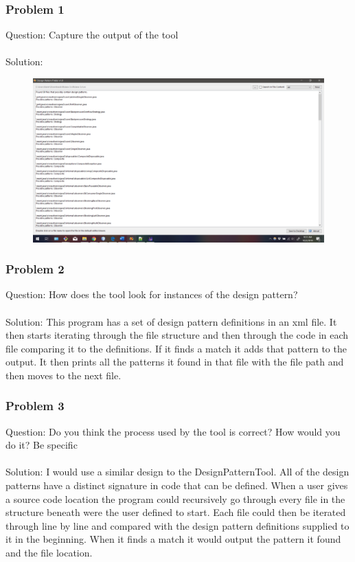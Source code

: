 \documentclass{article}
\begin{document}
\subsubsection*{Problem 1}
Question: Capture the output of the tool\\\\
Solution: 
\begin{figure}[h]
	\centering
	\includegraphics[width=6in]{hw4-patterns.png}
\end{figure}

\subsubsection*{Problem 2}
Question: How does the tool look for instances of the design pattern?\\\\
Solution: This program has a set of design pattern definitions in an xml file. It then starts iterating through the file structure and then through the code in each file comparing it to the definitions. If it finds a match it adds that pattern to the output. It then prints all the patterns it found in that file with the file path and then moves to the next file. 

\subsubsection*{Problem 3}
Question: Do you think the process used by the tool is correct?  How would you do it? Be specific\\\\
Solution: I would use a similar design to the DesignPatternTool. All of the design patterns have a distinct signature in code that can be defined. When a user gives a source code location the program could recursively go through every file in the structure beneath were the user defined to start. Each file could then be iterated through line by line and compared with the design pattern definitions supplied to it in the beginning. When it finds a match it would output the pattern it found and the file location. 
\end{document}

